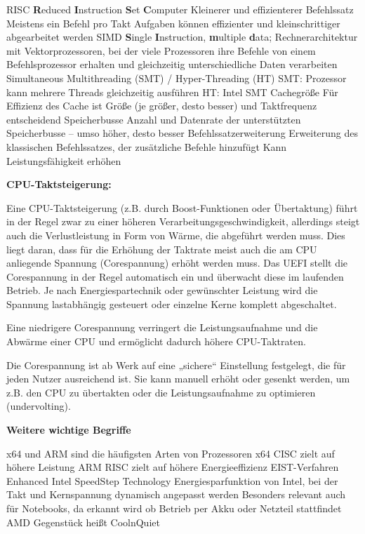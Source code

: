 \documentclass[10pt]{article}
\begin{document}
\begin{flushleft}
\begin{outline}
    \1 RISC
        \2 \textbf{R}educed \textbf{I}nstruction \textbf{S}et \textbf{C}omputer
        \2 Kleinerer und effizienterer Befehlssatz
        \2 Meistens ein Befehl pro Takt
        \2 Aufgaben können effizienter und kleinschrittiger abgearbeitet werden
    \1 SIMD
        \2 \textbf{S}ingle \textbf{I}nstruction, \textbf{m}ultiple \textbf{d}ata; Rechnerarchitektur mit Vektorprozessoren, bei der viele Prozessoren ihre Befehle von einem Befehlsprozessor erhalten und gleichzeitig unterschiedliche Daten verarbeiten
    \1 Simultaneous Multithreading (SMT) / Hyper-Threading (HT)
        \2 SMT: Prozessor kann mehrere Threads gleichzeitig ausführen
        \2 HT: Intel SMT
    \1 Cachegröße
        \2 Für Effizienz des Cache ist Größe (je größer, desto besser) und Taktfrequenz entscheidend
    \1 Speicherbusse
        \2 Anzahl und Datenrate der unterstützten Speicherbusse – umso höher, desto besser
    \1 Befehlssatzerweiterung
        \2 Erweiterung des klassischen Befehlssatzes, der zusätzliche Befehle hinzufügt
        \2 Kann Leistungsfähigkeit erhöhen
\end{outline}

\textbf{CPU-Taktsteigerung:}
\begin{outline}
    \1 Eine CPU-Taktsteigerung (z.B. durch Boost-Funktionen oder Übertaktung) führt in der Regel zwar zu einer höheren Verarbeitungsgeschwindigkeit, allerdings steigt auch die Verlustleistung in Form von Wärme, die abgeführt werden muss. Dies liegt daran, dass für die Erhöhung der Taktrate meist auch die am CPU anliegende Spannung (Corespannung) erhöht werden muss. Das UEFI stellt die Corespannung in der Regel automatisch ein und überwacht diese im laufenden Betrieb. Je nach Energiespartechnik oder gewünschter Leistung wird die Spannung lastabhängig gesteuert oder einzelne Kerne komplett abgeschaltet.
    
    \1 Eine niedrigere Corespannung verringert die Leistungsaufnahme und die Abwärme einer CPU und ermöglicht dadurch höhere CPU-Taktraten.

    \1 Die Corespannung ist ab Werk auf eine „sichere“ Einstellung festgelegt, die für jeden Nutzer ausreichend ist. Sie kann manuell erhöht oder gesenkt werden, um z.B. den CPU zu übertakten oder die Leistungsaufnahme zu optimieren (undervolting).
\end{outline}

\textbf{Weitere wichtige Begriffe}
\begin{outline}
    \1 x64 und ARM sind die häufigsten Arten von Prozessoren
        \2 x64 \textrightarrow\space CISC \textrightarrow\space zielt auf höhere Leistung
        \2 ARM \textrightarrow\space RISC \textrightarrow\space zielt auf höhere Energieeffizienz
    \1 EIST-Verfahren
        \2 Enhanced Intel SpeedStep Technology
        \2 Energiesparfunktion von Intel, bei der Takt und Kernspannung dynamisch angepasst werden
        \2 Besonders relevant auch für Notebooks, da erkannt wird ob Betrieb per Akku oder Netzteil stattfindet
        \2 AMD Gegenstück heißt CoolnQuiet
\end{outline}


\end{flushleft}
\end{document}
